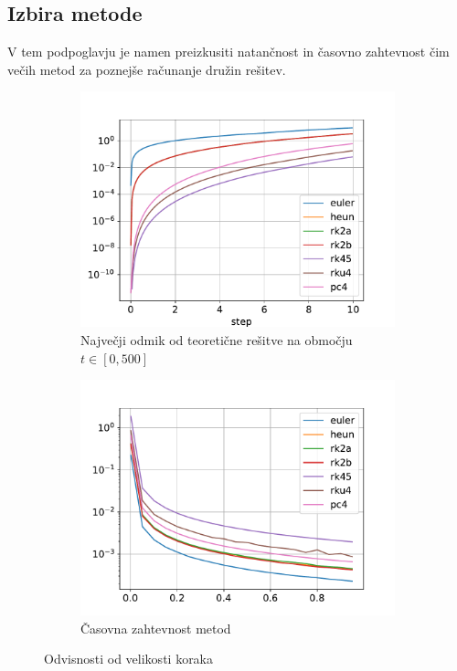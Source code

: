 \documentclass{article}
\begin{document}
\subsection{Izbira metode}
V tem podpoglavju je namen preizkusiti natančnost in časovno zahtevnost čim večih metod za poznejše računanje družin rešitev.


\begin{figure}[H]
    \centering
    \begin{subfigure}{0.49\textwidth}
        \centering
        \includegraphics[width=\linewidth]{precision.pdf}
		\caption{Največji odmik od teoretične rešitve na območju $t \in [0, 500]$}
    \end{subfigure}
    \hfill
    \begin{subfigure}{0.49\textwidth}
        \centering
		\includegraphics[width=\linewidth]{time.pdf}
		\caption{Časovna zahtevnost metod}
    \end{subfigure}
	\caption{Odvisnosti od velikosti koraka}
\end{figure}
\end{document}
